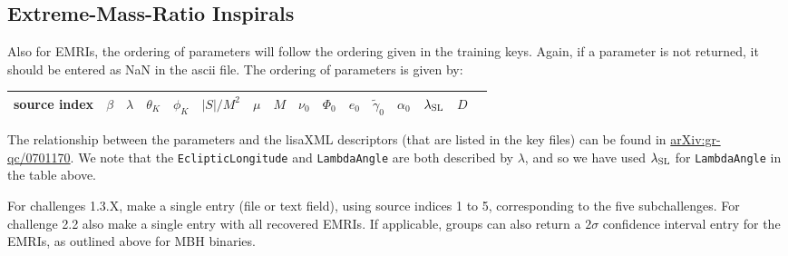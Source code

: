 \documentclass[11pt]{article}
\begin{document}
\subsection{Extreme-Mass-Ratio Inspirals}
Also for EMRIs, the ordering of parameters will follow the ordering given in the training keys. Again, if a parameter is not returned, it should be entered as NaN in the ascii file. The ordering of parameters is given by:
\begin{center}
	\begin{tabular}{cccccccccccccccc}
		\hline
		source index & $\beta$ & $\lambda$ & $\theta_K$ & $\phi_K$ & $|S|/M^2$ & $\mu$ & $M$ & $\nu_0$ & $\Phi_0$ & $e_0$ & $\tilde{\gamma}_0$ & $\alpha_0$ & $\lambda_{\rm SL}$ & $D$ \\
		\hline
	\end{tabular}
	\label{emrientries}
\end{center}
The relationship between the parameters and the lisaXML descriptors (that are listed in the key files) can be found in \url{arXiv:gr-qc/0701170}. We note that the {\tt EclipticLongitude} and {\tt LambdaAngle} are both described by $\lambda$, and so we have used $\lambda_{\rm SL}$ for {\tt LambdaAngle} in the table above.

For challenges 1.3.X, make a single entry (file or text field), using source indices 1 to 5, corresponding to the five subchallenges.
For challenge 2.2 also make a single entry with all recovered EMRIs.
If applicable, groups can also return a $2\sigma$ confidence interval entry for the EMRIs, as outlined above for MBH binaries. 
\end{document}
